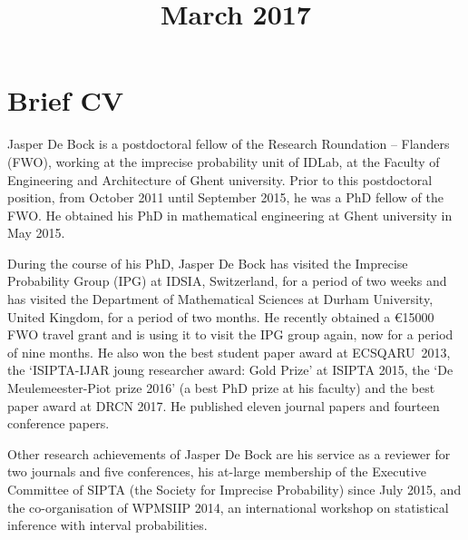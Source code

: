 \documentclass[11pt,a4paper,roman]{moderncv}
\title{March 2017}  %
\begin{document}
\renewcommand*{\cventry}[6]{%
  \cvline{#1}{%
    {\scshape#2}%
    \ifx#3\else{, {\slshape#3}}\fi%
    \ifx#4\else{, #4}\fi%
    \ifx#5\else{, #5}\fi%
    .%
    \ifx#6\else{\newline{}\begin{minipage}[t]{\linewidth}\small#6\end{minipage}}\fi
}}%


\maketitle

\vspace{-55pt}

\section{Brief CV}
\vspace{4pt}

Jasper De Bock is a postdoctoral fellow of the Research Roundation -- Flanders (FWO), working at the imprecise probability unit of IDLab, at the Faculty of Engineering and Architecture of Ghent university. Prior to this postdoctoral position, from October 2011 until September 2015, he was a PhD fellow of the FWO. He obtained his PhD in mathematical engineering at Ghent university in May 2015.

\hspace{17pt}During the course of his PhD, Jasper De Bock has visited the Imprecise Probability Group (IPG) at IDSIA, Switzerland, for a period of two weeks and has visited the Department of Mathematical Sciences at Durham University, United Kingdom, for a period of two months. He recently obtained a \euro{}15000 FWO travel grant and is using it to visit the IPG group again, now for a period of nine months. He also won the best student paper award at ECSQARU~2013, the `ISIPTA-IJAR joung researcher award: Gold Prize' at ISIPTA 2015, the `De Meulemeester-Piot prize 2016' (a best PhD prize at his faculty) and the best paper award at DRCN 2017. He published eleven journal papers and fourteen conference papers.

\hspace{17pt}Other research achievements of Jasper De Bock are his service as a reviewer for two journals and five conferences, his at-large membership of the Executive Committee of SIPTA (the Society for Imprecise Probability) since July 2015, and the co-organisation of WPMSIIP 2014, an international workshop on statistical inference with interval probabilities.
\end{document}
